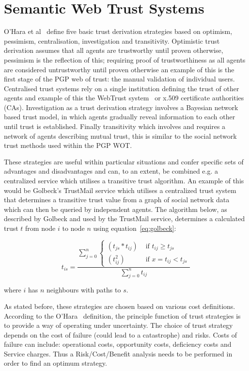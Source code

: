 \documentclass{acm_proc_article-sp}
\begin{document}
\section{Semantic Web Trust Systems}
O'Hara et al~\cite{ohara_trust_2004} define five basic trust derivation strategies based on optimism, pessimism, centralisation, investigation and transitivity.  Optimistic trust derivation assumes that all agents are trustworthy until proven otherwise, pessimism is the reflection of this; requiring proof of trustworthiness as all agents are considered untrustworthy until proven otherwise an example of this is the first stage of the PGP web of trust: the manual validation of individual users.  Centralised trust systems rely on a single institution defining the trust of other agents and example of this the WebTrust system~\cite{golbeck_trust_2003} or x.509 certificate authorities (CAs).  Investigation as a trust derivation strategy involves a Bayesian network based trust model, in which agents gradually reveal information to each other until trust is established.  Finally transitivity which involves and requires a network of agents describing mutual trust, this is similar to the social network trust methods used within the PGP WOT.

These strategies are useful within particular situations and confer specific sets of advantages and disadvantages and can, to an extent, be combined e.g. a centralized service which utilises a transitive trust algorithm.  An example of this would be Golbeck's TrustMail service which utilises a centralized trust system that determines a transitive trust value from a graph of social network data which can then be queried by independent agents.  The algorithm below, as described by Golbeck and used by the TrustMail service, determines a calculated trust $t$ from node $i$ to node $n$ using equation~\ref{eq:golbeck}:

\begin{equation}\label{eq:golbeck}
t_{is}=\frac{\sum_{j=0}^{n}{\begin{cases}
(t_{js}*t_{ij}) & \text{ if } t_{ij} \geq t_{js} \\ 
(t_{ij}^2) & \text{ if } x= t_{ij} < t_{js}
\end{cases}}}{\sum_{j=0}^{n}{t_{ij}}}
\end{equation}

where $i$ has $n$ neighbours with paths to $s$.

As stated before, these strategies are chosen based on various cost definitions.  According to the O'Hara~\cite{ohara_trust_2004} definition, the principle function of trust strategies is to provide a way of operating under uncertainty.   The choice of trust strategy depends on the cost of failure (could lead to a catastrophe) and risks.  Costs of failure can include: operational costs, opportunity costs, deficiency costs and Service charges.   Thus a Risk/Cost/Benefit analysis needs to be performed in order to find an optimum strategy.
\end{document}
